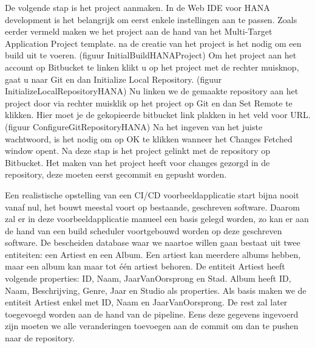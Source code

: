     De volgende stap is het project aanmaken. In de Web IDE voor HANA development is het belangrijk om eerst enkele instellingen aan te passen.
    Zoals eerder vermeld maken we het project aan de hand van het Multi-Target Application Project template. na de creatie van het project is het nodig om een build uit te voeren. (figuur InitialBuildHANAProject)
    Om het project aan het account op Bitbucket te linken klikt u op het project met de rechter muisknop, gaat u naar Git en dan Initialize Local Repository. (figuur InitializeLocalRepositoryHANA)
    Nu linken we de gemaakte repository aan het project door via rechter muisklik op het project op Git en dan Set Remote te klikken. Hier moet je de gekopieerde bitbucket link plakken in het veld voor URL. (figuur ConfigureGitRepositoryHANA) Na het ingeven van het juiste wachtwoord, is het nodig om op OK te klikken wanneer het Changes Fetched window opent.
    Na deze stap is het project gelinkt met de repository op Bitbucket. Het maken van het project heeft voor changes gezorgd in de repository, deze moeten eerst gecommit en gepusht worden. %
    
    Een realistische opstelling van een CI/CD voorbeeldapplicatie start bijna nooit vanaf nul, het bouwt meestal voort op bestaande, geschreven software.
    Daarom zal er in deze voorbeeldapplicatie manueel een basis gelegd worden, zo kan er aan de hand van een build scheduler voortgebouwd worden op deze geschreven software.
    De bescheiden database waar we naartoe willen gaan bestaat uit twee entiteiten: een Artiest en een Album. Een artiest kan meerdere albums hebben, maar een album kan maar tot één artiest behoren. De entiteit Artiest heeft volgende properties: ID, Naam, JaarVanOorsprong en Stad. Album heeft ID, Naam, Beschrijving, Genre, Jaar en Studio als properties. Als basis maken we de entiteit Artiest enkel met ID, Naam en JaarVanOorsprong. De rest zal later toegevoegd worden aan de hand van de pipeline.
    Eens deze gegevens ingevoerd zijn moeten we alle veranderingen toevoegen aan de commit om dan te pushen naar de repository.
    

